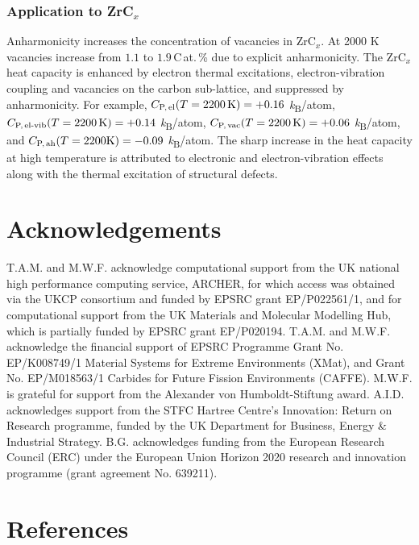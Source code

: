 \documentclass[twocolumn,american,aps,prb,showpacs,showkeys,amsmath,amssymb,superscriptaddress,a4]{revtex4-1}
\begin{document}
\subsubsection*{Application to ZrC\protect$_x$}

Anharmonicity increases the concentration of vacancies in ZrC$_x$.
At 2000 K vacancies increase from $1.1$ to $1.9$\,C\,at.\,\% due to explicit
anharmonicity. 
The ZrC$_x$ heat capacity is enhanced by electron thermal excitations, electron-vibration coupling and vacancies on the carbon sub-lattice, and suppressed by anharmonicity. For example, $C_{\text{P,\,el}}(T=2200\,\text{K})=+0.16$ \emph{k}\textsubscript{B}/atom, $C_{\text{P,\,el-vib}}(T=2200\,\text{K})=+0.14$ \emph{k}\textsubscript{B}/atom, $C_{\text{P,\,vac}}(T=2200\,\text{K})=+0.06$ \emph{k}\textsubscript{B}/atom, and $C_{\text{P,\,ah}}(T=2200\text{K})=-0.09$ \emph{k}\textsubscript{B}/atom.  The sharp increase in the heat capacity at high temperature is attributed to electronic and electron-vibration effects along with the thermal excitation of structural defects.

\section{Acknowledgements}

T.A.M. and M.W.F. acknowledge computational support from the UK national high
performance computing service, ARCHER, for which access was obtained
via the UKCP consortium and funded by EPSRC grant EP/P022561/1, and 
for computational support from the UK Materials and
Molecular Modelling Hub, which is partially funded by EPSRC grant EP/P020194. 
T.A.M. and M.W.F. acknowledge the
financial support of EPSRC Programme Grant No. EP/K008749/1 Material
Systems for Extreme Environments (XMat), and Grant No. EP/M018563/1 Carbides
for Future Fission Environments (CAFFE). M.W.F. is grateful for support
from the Alexander von Humboldt-Stiftung award. A.I.D. acknowledges
support from the STFC Hartree Centre\textquoteright s Innovation:
Return on Research programme, funded by the UK Department for Business,
Energy \& Industrial Strategy. 
B.G. acknowledges funding from the European Research Council (ERC) under the European Union Horizon 2020 research and innovation programme (grant agreement No. 639211). 

\cleardoublepage{}

\section{References}
\end{document}
